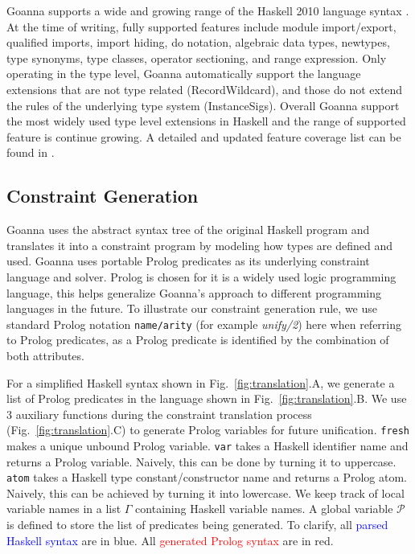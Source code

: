 \documentclass[pdflatex,sn-nature,Numbered]{sn-jnl}%
\begin{document}
    Goanna supports a wide and growing range of the Haskell 2010 language syntax \cite{Simon_Marlow2010-lg}. At the time of writing, fully supported features include module import/export, qualified imports, import hiding, do notation, algebraic data types, newtypes, type synonyms, type classes, operator sectioning, and range expression. Only operating in the type level, Goanna automatically support the language extensions that are not type related (RecordWildcard), and those do not extend the rules of the underlying type system (InstanceSigs). Overall Goanna support the most widely used type level extensions in Haskell and the range of supported feature is continue growing.  A detailed and updated feature coverage list can be found in \cite{Fu2023-rp}.

    \subsection{Constraint Generation} \label{sub:translation}
    Goanna uses the abstract syntax tree of the original Haskell program and translates it into a constraint program by modeling how types are defined and used. Goanna uses  portable Prolog predicates \cite{Wielemaker2011-sr} as its underlying constraint language and solver. Prolog is chosen for it is a widely used logic programming language, this helps generalize Goanna's approach to different programming languages in the future. To illustrate our constraint generation rule, we use standard Prolog notation \texttt{name/arity} (for example {\it unify/2}) here when referring to Prolog predicates, as a Prolog predicate is identified by the combination of both attributes. 
    
    For a simplified Haskell syntax shown in Fig.~\ref{fig:translation}.A, we generate a list of Prolog predicates in the language shown in Fig.~\ref{fig:translation}.B. We use 3 auxiliary functions during the constraint translation process (Fig.~\ref{fig:translation}.C) to generate Prolog variables for future unification. \texttt{fresh} makes a unique unbound Prolog variable. \texttt{var} takes a Haskell identifier name and returns a Prolog variable. Naively, this can be done by turning it to uppercase. \texttt{atom} takes a Haskell type constant/constructor name and returns a Prolog atom. Naively, this can be achieved by turning it into lowercase. We keep track of local variable names in a list $\Gamma$ containing Haskell variable names. A global variable $\mathcal{P}$ is defined to store the list of predicates being generated. To clarify, all \textcolor{blue}{parsed Haskell syntax} are in blue. All \textcolor{red}{generated Prolog syntax} are in red. 
    
\end{document}
